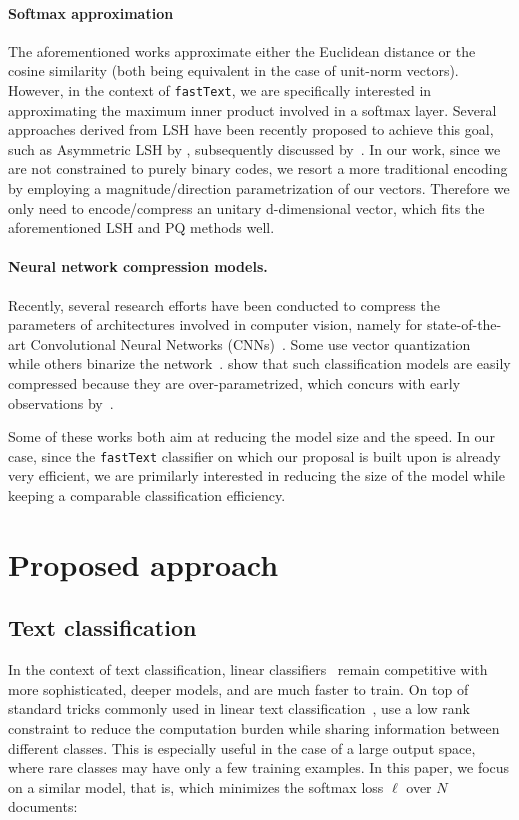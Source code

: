 \paragraph{Softmax approximation} The aforementioned works approximate either the Euclidean distance or the cosine similarity (both being equivalent in the case of unit-norm vectors). However, in the context of \texttt{fastText}, we are specifically interested in approximating the maximum inner product involved in a softmax layer. Several approaches derived from LSH have been recently proposed to achieve this goal, such as Asymmetric LSH by \citet{SL14}, subsequently discussed by~\citet{NS15}. 
In our work, since we are not constrained to purely binary codes, we resort a more traditional encoding by employing a magnitude/direction parametrization of our vectors. Therefore we only need to encode/compress an unitary d-dimensional vector, which fits the aforementioned LSH and PQ methods well. 

\paragraph{Neural network compression models.} Recently, several research efforts have been conducted to compress the parameters of architectures involved in computer vision, namely for state-of-the-art Convolutional Neural Networks (CNNs)~\citep{HMD16,LCMB15}. Some use vector quantization~\citep{GLYB14} while others binarize the network~\citep{CHSEB16}. \citet{DSDRF13} show that such classification models are easily compressed because they are over-parametrized, which concurs with early observations by~\citet{LDS90}.  

Some of these works both aim at reducing the model size and the speed. In our case, since the \texttt{fastText} classifier on which our proposal is built upon is already very efficient, we are primilarly interested in reducing the size of the model while keeping a comparable classification efficiency. 

\section{Proposed approach}
\label{sec:approach}

\subsection{Text classification}

In the context of text classification, linear classifiers~\citep{J16} remain competitive with more sophisticated, deeper models, and are much faster to train. On top of standard tricks commonly used in linear text classification~\citep{A14,W12,W09}, \citet{J16} use a low rank constraint to reduce the computation burden while sharing information between different classes. This is especially useful in the case of a large output space, where rare classes may have only a few training examples. In this paper, we focus on a similar model, that is, which minimizes the softmax loss $\ell$ over $N$ documents:


